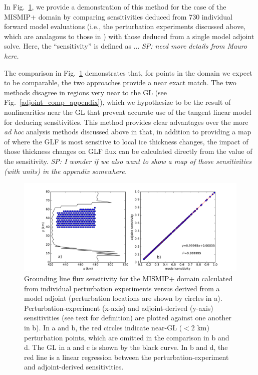 \documentclass[tc, manuscript]{copernicus}
\begin{document}

In Fig.~\ref{adjoint_comp}, we provide a demonstration of this method for the case of the MISMIP+ domain by comparing sensitivities deduced from 730 individual forward model evaluations (i.e., the perturbation experiments discussed above, which are analagous to those in \citet{reese2018}) with those deduced from a single model adjoint solve. Here, the ``sensitivity'' is defined as ... \textit{SP: need more details from Mauro here.} 

The comparison in Fig.~\ref{adjoint_comp} demonstrates that, for points in the domain we expect to be comparable, the two approaches provide a near exact match. The two methods disagree in regions very near to the GL (see Fig.~\ref{adjoint_comp_appendix}), which we hypothesize to be the result of nonlinearities near the GL that prevent accurate use of the tangent linear model for deducing sensitivities. This method provides clear advantages over the more \textit{ad hoc} analysis methods discussed above in that, in addition to providing a map of where the GLF is most sensitive to local ice thickness changes, the impact of those thickness changes on GLF flux can be calculated directly from the value of the sensitivity. \textit{SP: I wonder if we also want to show a map of those sensitivities (with units) in the appendix somewhere.}  

\begin{figure}
	\centering
    \includegraphics[width=1\linewidth]{figs/adjoint_comp.pdf}
    \caption{Grounding line flux sensitivity for the MISMIP+ domain calculated from individual perturbation experiments versus derived from a model adjoint (perturbation locations are shown by circles in a). Perturbation-experiment (x-axis) and adjoint-derived (y-axis) sensitivities (see text for definition) are plotted against one another in b). In a and b, the red circles indicate near-GL ($<$2 km) perturbation points, which are omitted in the comparison in b and d. The GL in a and c is shown by the black curve. In b and d, the red line is a linear regression between the perturbation-experiment and adjoint-derived sensitivities.}
	\label{adjoint_comp}
\end{figure}
\end{document}
